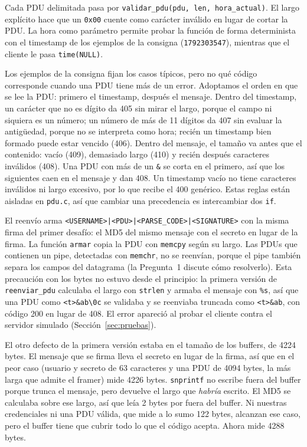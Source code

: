 \documentclass[11pt,a4paper]{article}
\newcommand{\code}[1]{\texttt{#1}}
\begin{document}
Cada PDU delimitada pasa por \code{validar\_pdu(pdu, len, hora\_actual)}. El largo explícito hace que un \code{0x00}
cuente como carácter inválido en lugar de cortar la PDU. La hora como parámetro permite probar la función de forma
determinista con el timestamp de los ejemplos de la consigna (\code{1792303547}), mientras que el cliente le pasa
\code{time(NULL)}.

Los ejemplos de la consigna fijan los casos típicos, pero no qué código corresponde cuando una PDU tiene más de un
error. Adoptamos el orden en que se lee la PDU: primero el timestamp, después el mensaje. Dentro del timestamp, un
carácter que no es dígito da 405 sin mirar el largo, porque el campo ni siquiera es un número; un número de más de
11 dígitos da 407 sin evaluar la antigüedad, porque no se interpreta como hora; recién un timestamp bien formado
puede estar vencido (406). Dentro del mensaje, el tamaño va antes que el contenido: vacío (409), demasiado largo
(410) y recién después caracteres inválidos (408). Una PDU con más de un \code{\&} se corta en el primero, así que
los siguientes caen en el mensaje y dan 408. Un timestamp vacío no tiene caracteres inválidos ni largo excesivo, por
lo que recibe el 400 genérico. Estas reglas están aisladas en \code{pdu.c}, así que cambiar una precedencia es
intercambiar dos \code{if}.

El reenvío arma \code{<USERNAME>|<PDU>|<PARSE\_CODE>|<SIGNATURE>} con la misma firma del primer desafío: el MD5 del
mismo mensaje con el secreto en lugar de la firma. La función \code{armar} copia la PDU con \code{memcpy} según su
largo. Las PDUs que contienen un pipe, detectadas con \code{memchr}, no se reenvían, porque el pipe también separa
los campos del datagrama (la Pregunta~1 discute cómo resolverlo). Esta precaución con los bytes no estuvo desde el
principio: la primera versión de \code{reenviar\_pdu} calculaba el largo con \code{strlen} y armaba el mensaje con
\code{\%s}, así que una PDU como \code{<t>\&ab\textbackslash 0c} se validaba y se reenviaba truncada como
\code{<t>\&ab}, con código 200 en lugar de 408. El error apareció al probar el cliente contra el servidor simulado
(Sección~\ref{sec:pruebas}).

El otro defecto de la primera versión estaba en el tamaño de los buffers, de 4224 bytes. El mensaje que se firma
lleva el secreto en lugar de la firma, así que en el peor caso (usuario y secreto de 63 caracteres y una PDU de 4094
bytes, la más larga que admite el framer) mide 4226 bytes. \code{snprintf} no escribe fuera del buffer porque trunca
el mensaje, pero devuelve el largo que \emph{habría} escrito. El MD5 se calculaba sobre ese largo, así que leía
2 bytes por fuera del buffer. Ni nuestras credenciales ni una PDU válida, que mide a lo sumo 122 bytes, alcanzan ese
caso, pero el buffer tiene que cubrir todo lo que el código acepta. Ahora mide 4288 bytes.
\end{document}
